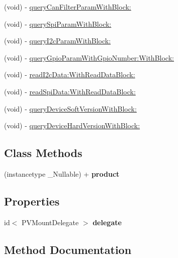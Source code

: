 \begin{DoxyCompactItemize}
\item 
(void) -\/ \hyperlink{interface_p_v_mount_a738423b137641196edbbf76c629f207f}{query\+Can\+Filter\+Param\+With\+Block\+:}
\item 
(void) -\/ \hyperlink{interface_p_v_mount_afc15ef1904a8d31435513d8d044ef538}{query\+Spi\+Param\+With\+Block\+:}
\item 
(void) -\/ \hyperlink{interface_p_v_mount_a3e6a6d1ce16ff6967855933e348624a5}{query\+I2c\+Param\+With\+Block\+:}
\item 
(void) -\/ \hyperlink{interface_p_v_mount_ab039ddbded99679ac0daa857664d09b7}{query\+Gpio\+Param\+With\+Gpio\+Number\+:\+With\+Block\+:}
\item 
(void) -\/ \hyperlink{interface_p_v_mount_a82425bd5d56955ff594f4310c0f49787}{read\+I2c\+Data\+:\+With\+Read\+Data\+Block\+:}
\item 
(void) -\/ \hyperlink{interface_p_v_mount_a04865a30db32f8eba0d5a94d118cc6c2}{read\+Spi\+Data\+:\+With\+Read\+Data\+Block\+:}
\item 
(void) -\/ \hyperlink{interface_p_v_mount_a6650263e34818ce41136ba4a79e790ff}{query\+Device\+Soft\+Version\+With\+Block\+:}
\item 
(void) -\/ \hyperlink{interface_p_v_mount_a0b34e8f710a1ff6d4c1d4eeb358f1675}{query\+Device\+Hard\+Version\+With\+Block\+:}
\end{DoxyCompactItemize}
\subsection*{Class Methods}
\begin{DoxyCompactItemize}
\item 
\mbox{\label{interface_p_v_mount_a58f94c0911360e2dc1cdcfd9cd74a904}} 
(instancetype \+\_\+\+Nullable) + {\bfseries product}
\end{DoxyCompactItemize}
\subsection*{Properties}
\begin{DoxyCompactItemize}
\item 
\mbox{\label{interface_p_v_mount_aad93defdfb2508bfd8744405547b0b86}} 
id$<$ P\+V\+Mount\+Delegate $>$ {\bfseries delegate}
\end{DoxyCompactItemize}


\subsection{Method Documentation}
\mbox{\label{interface_p_v_mount_a08a223bd5b4daab480c8755d5ef17975}} 
